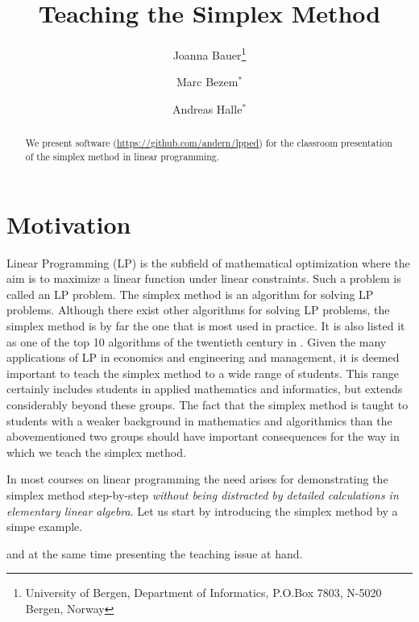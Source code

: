 \documentclass[ukenglish]{nik}
\begin{document}
\title{Teaching the Simplex Method}

\author{
Joanna Bauer\thanks{University of Bergen, Department of Informatics, P.O.Box 7803, N-5020 Bergen, Norway}
\and
Marc Bezem$^*$
\and
Andreas Halle$^*$}
\maketitle

\begin{abstract}
We present software (\url{https://github.com/andern/lpped})
for the classroom presentation of the simplex method in linear programming.
\end{abstract}

\section{Motivation}
Linear Programming (LP) is the subfield of mathematical optimization where
the aim is to maximize a linear function under linear constraints. Such a problem
is called an LP problem. The simplex method is an algorithm for solving LP problems. 
Although there exist other algorithms for solving LP problems,
the simplex method is by far the one that is most used in practice.
It is also listed it as one of the top 10 algorithms of the twentieth century in
\cite{CiSaE2000}. Given the many applications of LP in economics and engineering and
management, it is deemed important to teach the simplex method to a wide range of
students. This range certainly includes students in applied mathematics and informatics,
but extends considerably beyond these groups. The fact that the simplex method is
taught to students with a weaker background in mathematics and algorithmics than
the abovementioned two groups should have important consequences for the way
in which we teach the simplex method.

In most courses on linear programming the need arises for demonstrating the simplex method step-by-step 
\emph{without being distracted by detailed calculations in elementary linear algebra}. Let us start by
introducing the simplex method by a simpe example.

and at the same time presenting the teaching issue at hand. 
\end{document}
